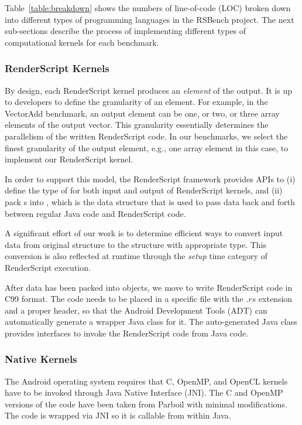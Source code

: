 Table~\ref{table:breakdown} shows the numbers of line-of-code (LOC) broken down
into different types of programming languages in the RSBench project. The next
sub-sections describe the process of implementing different types of computational
kernels for each benchmark.

\subsubsection{RenderScript Kernels}

By design, each RenderScript kernel produces an \textit{element} of the output.
It is up to developers to define the granularity of an element. For example, in
the VectorAdd benchmark, an output element can be one, or two, or three array
elements of the output vector. This granularity essentially determines the
parallelism of the written RenderScript code. In our benchmarks, we select the
finest granularity of the output element, e.g., one array element in this case,
to implement our RenderScript kernel.

In order to support this model, the RenderScript framework provides APIs to (i)
define the type of  for both input and output of RenderScript
kernels, and (ii) pack s into , which is the data
structure that is used to pass data back and forth between regular Java code and
RenderScript code.

A significant effort of our work is to determine efficient ways to convert input
data from original structure to the  structure with appropriate
 type. This conversion is also reflected at runtime through the
\textit{setup} time category of RenderScript execution.

After data has been packed into  objects, we move to write
RenderScript code in C99 format. The code needs to be placed in a specific file
with the $.rs$ extension and a proper header, so that the Android Development
Tools (ADT) can automatically generate a wrapper Java class for it. The
auto-generated Java class provides interfaces to invoke the RenderScript code
from Java code.

\subsubsection{Native Kernels}

The Android operating system requires that C, OpenMP, and OpenCL kernels have to
be invoked through Java Native Interface (JNI).  The C and OpenMP versions of
the code have been taken from Parboil with minimal modifications.  The code is
wrapped via JNI so it is callable from within Java.

